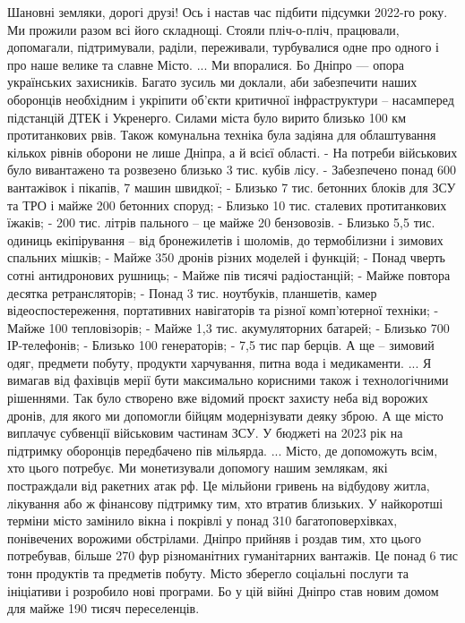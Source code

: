 \obeycr
Шановні земляки, дорогі друзі! 
Ось і настав час підбити підсумки 2022-го року. 
Ми прожили разом всі його складнощі. Стояли пліч-о-пліч, працювали, допомагали, підтримували, раділи, переживали, турбувалися одне про одного і про наше велике та славне Місто. 
...
Ми впоралися.
Бо Дніпро — опора українських захисників.
Багато зусиль ми доклали, аби забезпечити наших оборонців необхідним і укріпити об'єкти критичної інфраструктури – насамперед підстанцій ДТЕК і Укренерго. 
Силами міста було вирито близько 100 км протитанкових рвів. 
Також комунальна техніка була задіяна для облаштування кількох рівнів оборони не лише Дніпра, а й всієї області. 
- На потреби військових було вивантажено та розвезено близько 3 тис. кубів лісу.  
- Забезпечено понад 600 вантажівок і пікапів, 7 машин швидкої; 
- Близько 7 тис. бетонних блоків для ЗСУ та ТРО і майже 200 бетонних споруд;
- Близько 10 тис. сталевих протитанкових їжаків;
- 200 тис. літрів пального – це майже 20 бензовозів. 
- Близько 5,5 тис. одиниць екіпірування – від бронежилетів і шоломів, до термобілизни і зимових спальних мішків;
- Майже 350 дронів різних моделей і функцій;
- Понад чверть сотні антидронових рушниць;
- Майже пів тисячі радіостанцій;
- Майже повтора десятка ретрансляторів;
- Понад 3 тис. ноутбуків, планшетів, камер відеоспостереження, портативних навігаторів та різної комп'ютерної техніки;
- Майже 100 тепловізорів;
- Майже 1,3 тис. акумуляторних батарей;
- Близько 700 ІР-телефонів;
- Близько 100 генераторів;
- 7,5 тис пар берців.
А ще – зимовий одяг, предмети побуту, продукти харчування, питна вода і медикаменти. 
...
Я вимагав від фахівців мерії бути максимально корисними також і технологічними рішеннями.
Так було створено вже відомий проєкт захисту неба від ворожих дронів, для якого ми допомогли бійцям модернізувати деяку зброю. 
А ще місто виплачує субвенції військовим частинам ЗСУ. 
У бюджеті на 2023 рік на підтримку оборонців передбачено пів мільярда.
...
Місто, де допоможуть всім, хто цього потребує.
Ми монетизували допомогу нашим землякам, які постраждали від ракетних атак рф. 
Це мільйони гривень на відбудову житла, лікування або ж фінансову підтримку тим, хто втратив близьких. 
У найкоротші терміни місто замінило вікна і покрівлі у понад 310 багатоповерхівках, понівечених ворожими обстрілами.
Дніпро прийняв і роздав тим, хто цього потребував, більше 270 фур різноманітних гуманітарних вантажів. 
Це понад 6 тис тонн продуктів та предметів побуту. 
Місто зберегло соціальні послуги та ініціативи і розробило нові програми. 
Бо у цій війні Дніпро став новим домом для майже 190 тисяч переселенців. 
